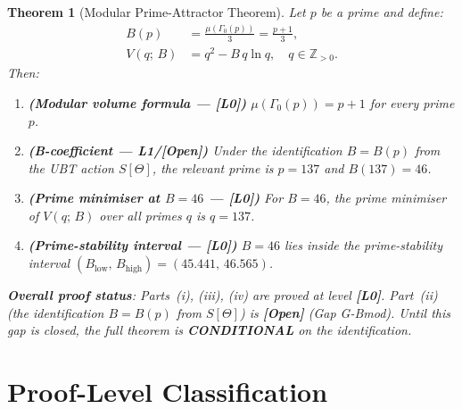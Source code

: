 \documentclass[12pt,a4paper]{article}
\newtheorem{theorem}{Theorem}[section]
\theoremstyle{definition}
\theoremstyle{remark}
\newcommand{\ZZ}{\mathbb{Z}}
\newcommand{\OPEN}{\textbf{[Open]}}
\newcommand{\Lzero}{\textbf{[L0]}}
\begin{document}
\begin{tcolorbox}[colback=green!5!white,colframe=green!50!black,
  title=Modular Prime-Attractor Theorem (MPAT)]

\begin{theorem}[Modular Prime-Attractor Theorem]
\label{thm:mpat:main}
Let $p$ be a prime and define:
\begin{align}
  B(p) &= \frac{\mu(\Gamma_0(p))}{3} = \frac{p+1}{3},
  \label{eq:mpat:main_B}\\
  V(q;\,B) &= q^2 - B\,q\ln q, \quad q \in \ZZ_{>0}.
  \label{eq:mpat:main_V}
\end{align}
Then:
\begin{enumerate}
  \item[(i)] \textbf{(Modular volume formula — \Lzero)}
        $\mu(\Gamma_0(p)) = p + 1$ for every prime $p$.

  \item[(ii)] \textbf{(B-coefficient — L1/\OPEN)}
        Under the identification $B = B(p)$ from the UBT action $S[\Theta]$,
        the relevant prime is $p = 137$ and $B(137) = 46$.

  \item[(iii)] \textbf{(Prime minimiser at $B = 46$ — \Lzero)}
        For $B = 46$, the prime minimiser of $V(q;\,B)$ over all primes $q$ is
        $q = 137$.

  \item[(iv)] \textbf{(Prime-stability interval — \Lzero)}
        $B = 46$ lies inside the prime-stability interval
        $(B_{\mathrm{low}},\,B_{\mathrm{high}}) = (45.441,\,46.565)$.
\end{enumerate}

\medskip
\noindent
\textbf{Overall proof status}: Parts~(i), (iii), (iv) are proved at level \Lzero.
Part~(ii) (the identification $B = B(p)$ from $S[\Theta]$) is \textbf{\OPEN}
(Gap G-Bmod).  Until this gap is closed, the full theorem is
\textbf{CONDITIONAL} on the identification.
\end{theorem}
\end{tcolorbox}

\section{Proof-Level Classification}
\label{sec:mpat:levels}
\end{document}

